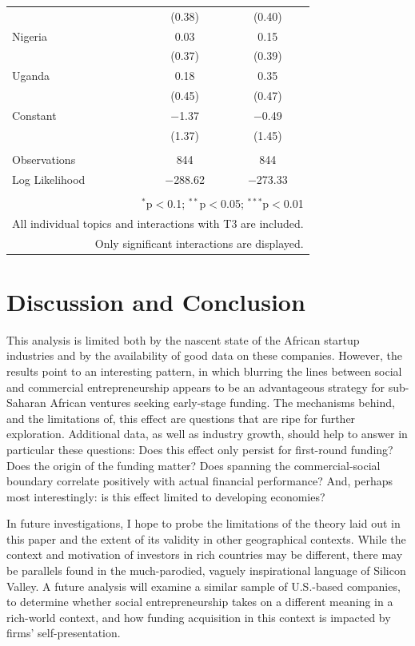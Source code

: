 \documentclass[12pt]{article}
\begin{document}
\begin{table}[!htbp]
\begin{tabular}{@{\extracolsep{5pt}}lcc}
  & (0.38) & (0.40) \\ 
  Nigeria & 0.03 & 0.15 \\ 
  & (0.37) & (0.39) \\ 
  Uganda & 0.18 & 0.35 \\ 
  & (0.45) & (0.47) \\ 
  Constant & $-$1.37 & $-$0.49 \\ 
  & (1.37) & (1.45) \\ 
 \hline \\[-1.8ex] 
Observations & 844 & 844 \\ 
Log Likelihood & $-$288.62 & $-$273.33 \\ 
\hline 
\hline \\[-1.8ex] 
\multicolumn{3}{r}{$^{*}$p$<$0.1; $^{**}$p$<$0.05; $^{***}$p$<$0.01} \\ 
 \multicolumn{3}{r}{\scriptsize{All individual topics and interactions with T3 are included.}} \\ 
 \multicolumn{3}{r}{\scriptsize{Only significant interactions are displayed.}} \\ 
\end{tabular} 
\end{table} 

\FloatBarrier

\section{Discussion and Conclusion}

This analysis is limited both by the nascent state of the African startup industries and by the availability of good data on these companies. However, the results point to an interesting pattern, in which blurring the lines between social and commercial entrepreneurship appears to be an advantageous strategy for sub-Saharan African ventures seeking early-stage funding. The mechanisms behind, and the limitations of, this effect are questions that are ripe for further exploration. Additional data, as well as industry growth, should help to answer in particular these questions: Does this effect only persist for first-round funding? Does the origin of the funding matter? Does spanning the commercial-social boundary correlate positively with actual financial performance? And, perhaps most interestingly: is this effect limited to developing economies?

In future investigations, I hope to probe the limitations of the theory laid out in this paper and the extent of its validity in other geographical contexts. While the context and motivation of investors in rich countries may be different, there may be parallels found in the much-parodied, vaguely inspirational language of Silicon Valley. A future analysis will examine a similar sample of U.S.-based companies, to determine whether social entrepreneurship takes on a different meaning in a rich-world context, and how funding acquisition in this context is impacted by firms' self-presentation.
\end{document}
